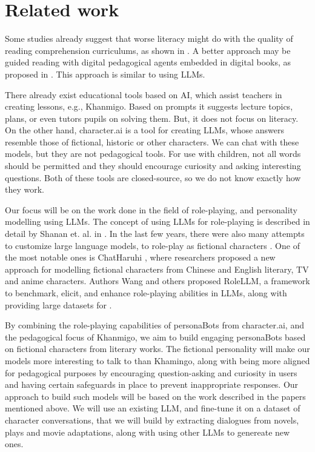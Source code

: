 \documentclass[fleqn,moreauthors,10pt]{ds_report}
\begin{document}
\section*{Related work}

Some studies already suggest that worse literacy might do with the
quality of reading comprehension curriculums, as shown in
\cite{bogaerds-hazenberg_what_2022}. A better approach may be guided 
reading with digital pedagogical agents embedded in digital books,
as proposed in \cite{nielen_digital_2018}. This approach is similar
to using LLMs.

There already exist educational tools based on AI, which assist teachers
in creating lessons, e.g., Khanmigo. Based on prompts it suggests lecture
topics, plans, or even tutors pupils on solving them. But, it does not
focus on literacy. On the other hand, character.ai is a tool for creating
LLMs, whose answers resemble those of fictional, historic or other
characters. We can chat with these models, but they are not pedagogical
tools. For use with children, not all words should be permitted and
they should encourage curiosity and asking interesting questions. Both
of these tools are closed-source, so we do not know exactly how they
work.

Our focus will be on the work done in the field of role-playing, and personality modelling using LLMs. The concept of using LLMs for role-playing is described in detail by Shanan et. al. in \cite{shanahan_role-play_2023}. 
In the last few years, there were also many attempts to customize large language models, to role-play as fictional characters \cite{li_chatharuhi_2023, wang_incharacter_2024, shao_character-llm_2023, wang_rolellm_2023, chen_large_2023}. One of the most notable ones is ChatHaruhi \cite{li_chatharuhi_2023}, where researchers proposed a new approach for modelling fictional characters from Chinese and English literary, TV and anime characters. Authors Wang and others proposed RoleLLM, a framework to benchmark, elicit,
and enhance role-playing abilities in LLMs, along with providing large datasets for \cite{wang_rolellm_2023}.

By combining the role-playing capabilities of personaBots from character.ai, and the pedagogical focus of Khanmigo, we aim to build engaging personaBots based on fictional characters from literary works. The fictional personality will make our models more interesting to talk to than Khamingo, along with being more aligned for pedagogical purposes by encouraging question-asking and curiosity in users and having certain safeguards in place to prevent inappropriate responses.
Our approach to build such models will be based on the work described in the papers mentioned above.
We will use an existing LLM, and fine-tune it on a dataset of character
conversations, that we will build by extracting dialogues from novels,
plays and movie adaptations, along with using other LLMs to genereate new ones.


\end{document}
